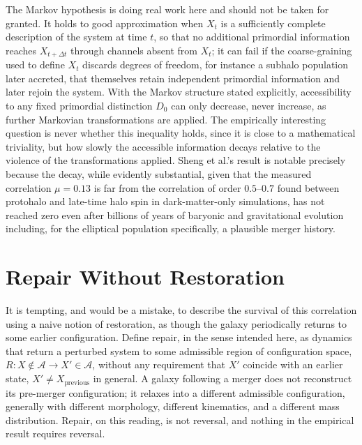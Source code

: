 \documentclass[11pt]{article}
\begin{document}
The Markov hypothesis is doing real work here and should not be taken for granted. It holds to good approximation when $X_t$ is a sufficiently complete description of the system at time $t$, so that no additional primordial information reaches $X_{t+\Delta t}$ through channels absent from $X_t$; it can fail if the coarse-graining used to define $X_t$ discards degrees of freedom, for instance a subhalo population later accreted, that themselves retain independent primordial information and later rejoin the system. With the Markov structure stated explicitly, accessibility to any fixed primordial distinction $D_0$ can only decrease, never increase, as further Markovian transformations are applied. The empirically interesting question is never whether this inequality holds, since it is close to a mathematical triviality, but how slowly the accessible information decays relative to the violence of the transformations applied. Sheng et al.'s result is notable precisely because the decay, while evidently substantial, given that the measured correlation $\mu = 0.13$ is far from the correlation of order $0.5$–$0.7$ found between protohalo and late-time halo spin in dark-matter-only simulations, has not reached zero even after billions of years of baryonic and gravitational evolution including, for the elliptical population specifically, a plausible merger history.

\section{Repair Without Restoration}

It is tempting, and would be a mistake, to describe the survival of this correlation using a naive notion of restoration, as though the galaxy periodically returns to some earlier configuration. Define repair, in the sense intended here, as dynamics that return a perturbed system to some admissible region of configuration space, $R: X \notin \mathcal A \to X' \in \mathcal A$, without any requirement that $X'$ coincide with an earlier state, $X' \neq X_{\mathrm{previous}}$ in general. A galaxy following a merger does not reconstruct its pre-merger configuration; it relaxes into a different admissible configuration, generally with different morphology, different kinematics, and a different mass distribution. Repair, on this reading, is not reversal, and nothing in the empirical result requires reversal.
\end{document}

